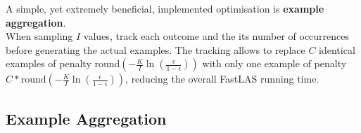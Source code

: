 A simple, yet extremely beneficial, implemented optimisation is \textbf{example aggregation}. \\
When sampling $I$ values, track each outcome and the its number of occurrences before generating the actual examples.
The tracking allows to replace $C$ identical examples of penalty $\text{round} \left ( -\frac{K}{I} \ln \left ( \frac{\epsilon}{1 - \epsilon} \right ) \right )$ with only one example of penalty $C * \text{round} \left ( -\frac{K}{I} \ln \left ( \frac{\epsilon}{1 - \epsilon} \right ) \right )$, reducing the overall FastLAS running time.



\subsection{Example Aggregation}

